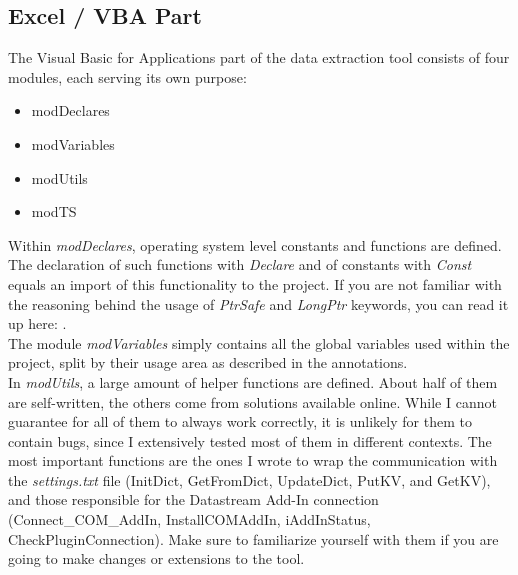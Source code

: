 \subsection{Excel / VBA Part}
The Visual Basic for Applications part of the data extraction tool consists of four modules, each serving its own purpose: 
\begin{itemize}
	\item modDeclares
	\item modVariables
	\item modUtils
	\item modTS
\end{itemize}
Within \textit{modDeclares}, operating system level constants and functions are defined. The declaration of such functions with \textit{Declare} and of constants with \textit{Const} equals an import of this functionality to the project. If you are not familiar with the reasoning behind the usage of \textit{PtrSafe} and \textit{LongPtr} keywords, you can read it up here: .  \\ %

The module \textit{modVariables} simply contains all the global variables used within the project, split by their usage area as described in the annotations. \\

In \textit{modUtils}, a large amount of helper functions are defined. About half of them are self-written, the others come from solutions available online. While I cannot guarantee for all of them to always work correctly, it is unlikely for them to contain bugs, since I extensively tested most of them in different contexts. 
The most important functions are the ones I wrote to wrap the communication with the \textit{settings.txt} file (InitDict, GetFromDict, UpdateDict, PutKV, and GetKV), and those responsible for the Datastream Add-In connection (Connect\_COM\_AddIn, InstallCOMAddIn, iAddInStatus, CheckPluginConnection). Make sure to familiarize yourself with them if you are going to make changes or extensions to the tool. \\

